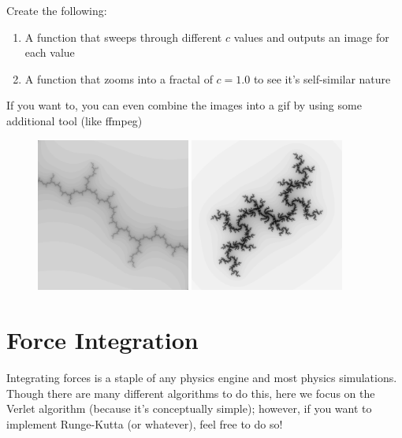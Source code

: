 \documentclass[11pt]{article}
\begin{document}
Create the following: 
\begin{enumerate}
\item A function that sweeps through different $c$ values and outputs an image for each value
\item A function that zooms into a fractal of $c=1.0$ to see it's self-similar nature
\end{enumerate}

If you want to, you can even combine the images into a gif by using some additional tool (like ffmpeg)
\begin{figure}
\begin{center}
\includegraphics[width=0.45\textwidth]{fractal_zoom00030.png}
\includegraphics[width=0.45\textwidth]{c_scan00030.png}
\end{center}
\end{figure}

\newpage
\section*{Force Integration}
Integrating forces is a staple of any physics engine and most physics simulations. Though there are many different algorithms to do this, here we focus on the Verlet algorithm (because it's conceptually simple); however, if you want to implement Runge-Kutta (or whatever), feel free to do so!
\end{document}
